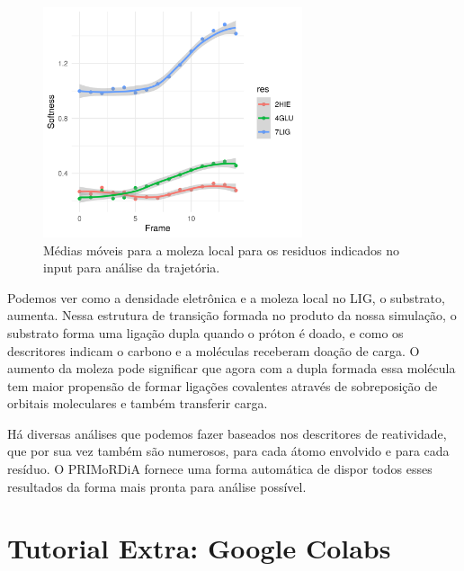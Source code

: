 \documentclass[a4paper,11pt]{refart}
\begin{document}
\hspace*{-\leftmarginwidth}
\begin{minipage}{\fullwidth}
	\begin{figure}[H]
		\begin{center}
			\includegraphics[width=3in]{images/tut6_img16}
			\caption{Médias móveis para a moleza local para os residuos indicados no input para análise da trajetória.}
			\label{fig_tut6_15}
		\end{center}
	\end{figure}
\end{minipage}

Podemos ver como a densidade eletrônica e a moleza local no LIG, o substrato, aumenta. Nessa estrutura de transição formada no produto da nossa simulação, o substrato forma uma ligação dupla quando o próton é doado, e como os descritores indicam o carbono e a moléculas receberam doação de carga. O aumento da moleza pode significar que agora com a dupla formada essa molécula tem maior propensão de formar ligações covalentes através de sobreposição de orbitais moleculares e também transferir carga. 

Há diversas análises que podemos fazer baseados nos descritores de reatividade, que por sua vez também são numerosos, para cada átomo envolvido e para cada resíduo. O PRIMoRDiA fornece uma forma automática de dispor todos esses resultados da forma mais pronta para análise possível. 

\section{Tutorial Extra: Google Colabs}
\end{document}
